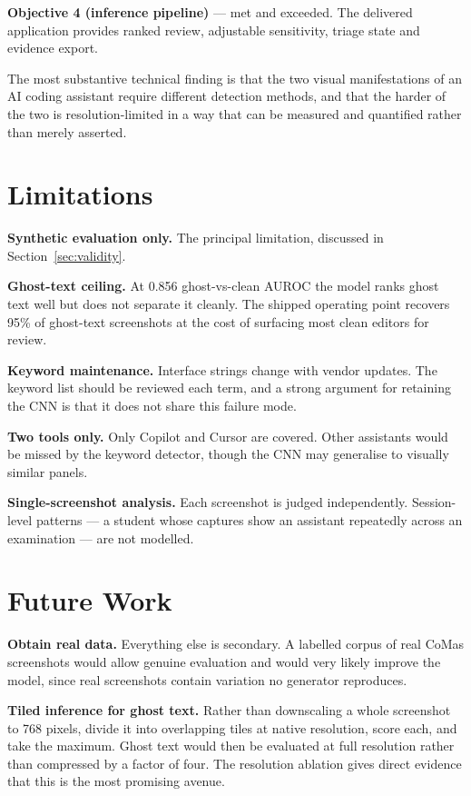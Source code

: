\documentclass[12pt,oneside]{report}
\begin{document}
\textbf{Objective 4 (inference pipeline)} --- met and exceeded. The delivered
application provides ranked review, adjustable sensitivity, triage state and
evidence export.

The most substantive technical finding is that the two visual manifestations of
an AI coding assistant require different detection methods, and that the harder
of the two is resolution-limited in a way that can be measured and quantified
rather than merely asserted.

\section{Limitations}
\label{sec:limitations}

\textbf{Synthetic evaluation only.} The principal limitation, discussed in
Section~\ref{sec:validity}.

\textbf{Ghost-text ceiling.} At 0.856 ghost-vs-clean AUROC the model ranks
ghost text well but does not separate it cleanly. The shipped operating point
recovers 95\% of ghost-text screenshots at the cost of surfacing most clean
editors for review.

\textbf{Keyword maintenance.} Interface strings change with vendor updates. The
keyword list should be reviewed each term, and a strong argument for retaining
the CNN is that it does not share this failure mode.

\textbf{Two tools only.} Only Copilot and Cursor are covered. Other assistants
would be missed by the keyword detector, though the CNN may generalise to
visually similar panels.

\textbf{Single-screenshot analysis.} Each screenshot is judged independently.
Session-level patterns --- a student whose captures show an assistant
repeatedly across an examination --- are not modelled.

\section{Future Work}
\label{sec:future}

\textbf{Obtain real data.} Everything else is secondary. A labelled corpus of
real CoMas screenshots would allow genuine evaluation and would very likely
improve the model, since real screenshots contain variation no generator
reproduces.

\textbf{Tiled inference for ghost text.} Rather than downscaling a whole
screenshot to 768 pixels, divide it into overlapping tiles at native
resolution, score each, and take the maximum. Ghost text would then be
evaluated at full resolution rather than compressed by a factor of four. The
resolution ablation gives direct evidence that this is the most promising
avenue.
\end{document}
